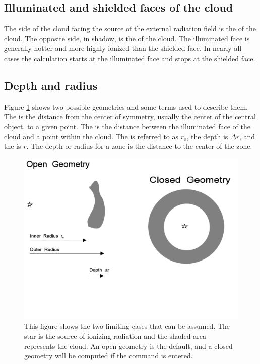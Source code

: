 \subsection{Illuminated and shielded faces of the cloud}

The side of the cloud facing the source of the external radiation field
is the  of the cloud.
The opposite side, in shadow, is the  of the cloud.  
The illuminated face is generally
hotter and more highly ionized than the shielded face.
In nearly all cases the calculation starts at the illuminated face and stops at the shielded face.

\subsection{Depth and radius}

Figure \ref{fig:GeometryOpenClosed} shows two possible geometries
and some terms used to describe them.
The  is the distance from the center of symmetry,
usually the center of the central object, to a given point.
The  is the distance
between the illuminated face of the cloud and a point within the cloud.
The  is referred to as $r_o$,
the depth is $\Delta r$, and the  is $r$.
The depth or radius for a zone is the distance to the center of the zone.

\begin{figure}
\centering
\includegraphics[scale=0.5]{GeometryOpenClosed}
\caption[Open and closed geometries]
{This figure shows the two limiting cases that can be assumed.
The star is the source of ionizing radiation and the shaded area represents
the cloud. An open geometry is the default, and a closed geometry will be
computed if the  command is entered.}
\label{fig:GeometryOpenClosed}
\end{figure}

